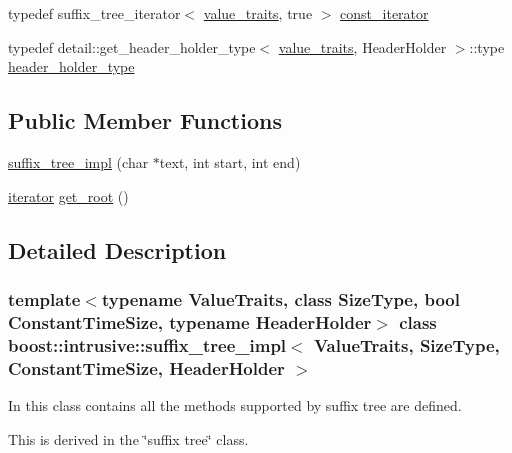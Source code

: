 \begin{DoxyCompactItemize}
\item 
typedef suffix\+\_\+tree\+\_\+iterator$<$ \hyperlink{classboost_1_1intrusive_1_1suffix__tree__impl_a30d9e164c38c11cd38917ad14e9f3e88}{value\+\_\+traits}, true $>$ \hyperlink{classboost_1_1intrusive_1_1suffix__tree__impl_a221fd6a26db0f6aa44951317caa66126}{const\+\_\+iterator}
\item 
typedef detail\+::get\+\_\+header\+\_\+holder\+\_\+type$<$ \hyperlink{classboost_1_1intrusive_1_1suffix__tree__impl_a30d9e164c38c11cd38917ad14e9f3e88}{value\+\_\+traits}, Header\+Holder $>$\+::type \hyperlink{classboost_1_1intrusive_1_1suffix__tree__impl_acb00482132fdd79dc983b313f596e364}{header\+\_\+holder\+\_\+type}
\end{DoxyCompactItemize}
\subsection*{Public Member Functions}
\begin{DoxyCompactItemize}
\item 
\hyperlink{classboost_1_1intrusive_1_1suffix__tree__impl_aa4b4ae2215af3b696dae241d1cbfe825}{suffix\+\_\+tree\+\_\+impl} (char $\ast$text, int start, int end)
\item 
\hyperlink{classboost_1_1intrusive_1_1suffix__tree__impl_a2df3b52dced59346b59db470e93ba87c}{iterator} \hyperlink{classboost_1_1intrusive_1_1suffix__tree__impl_a76664f3f9926b5d5deb22b08ac964720}{get\+\_\+root} ()
\end{DoxyCompactItemize}


\subsection{Detailed Description}
\subsubsection*{template$<$typename Value\+Traits, class Size\+Type, bool Constant\+Time\+Size, typename Header\+Holder$>$\newline
class boost\+::intrusive\+::suffix\+\_\+tree\+\_\+impl$<$ Value\+Traits, Size\+Type, Constant\+Time\+Size, Header\+Holder $>$}


\begin{DoxyItemize}
\item In this class contains all the methods supported by suffix tree are defined.  
\item This is derived in the \char`\"{}suffix tree\char`\"{} class.  
\end{DoxyItemize}

